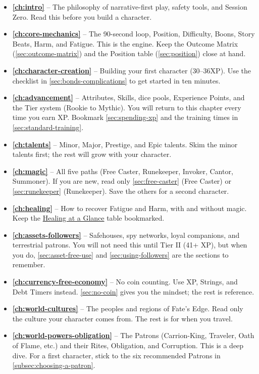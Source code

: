 \begin{itemize}
    \item \textbf{\autoref{ch:intro}} -- The philosophy of narrative-first play, safety tools, and Session Zero. Read this before you build a character.
    \item \textbf{\autoref{ch:core-mechanics}} -- The 90-second loop, Position, Difficulty, Boons, Story Beats, Harm, and Fatigue. This is the engine. Keep the Outcome Matrix (\autoref{sec:outcome-matrix}) and the Position table (\autoref{sec:position}) close at hand.
    \item \textbf{\autoref{ch:character-creation}} -- Building your first character (30--36XP). Use the checklist in \autoref{sec:bonds-complications} to get started in ten minutes.
    \item \textbf{\autoref{ch:advancement}} -- Attributes, Skills, dice pools, Experience Points, and the Tier system (Rookie to Mythic). You will return to this chapter every time you earn XP. Bookmark \autoref{sec:spending-xp} and the training times in \autoref{sec:standard-training}.
    \item \textbf{\autoref{ch:talents}} -- Minor, Major, Prestige, and Epic talents. Skim the minor talents first; the rest will grow with your character.
    \item \textbf{\autoref{ch:magic}} -- All five paths (Free Caster, Runekeeper, Invoker, Cantor, Summoner). If you are new, read only \autoref{sec:free-caster} (Free Caster) or \autoref{sec:runekeeper} (Runekeeper). Save the others for a second character.
    \item \textbf{\autoref{ch:healing}} -- How to recover Fatigue and Harm, with and without magic. Keep the \hyperref[sec:healing-summary]{Healing at a Glance} table bookmarked.
    \item \textbf{\autoref{ch:assets-followers}} -- Safehouses, spy networks, loyal companions, and terrestrial patrons. You will not need this until Tier II (41+ XP), but when you do, \autoref{sec:asset-free-use} and \autoref{sec:using-followers} are the sections to remember.
    \item \textbf{\autoref{ch:currency-free-economy}} -- No coin counting. Use XP, Strings, and Debt Timers instead. \autoref{sec:no-coin} gives you the mindset; the rest is reference.
    \item \textbf{\autoref{ch:world-cultures}} -- The peoples and regions of Fate's Edge. Read only the culture your character comes from. The rest is for when you travel.
    \item \textbf{\autoref{ch:world-powers-obligation}} -- The Patrons (Carrion-King, Traveler, Oath of Flame, etc.) and their Rites, Obligation, and Corruption. This is a deep dive. For a first character, stick to the six recommended Patrons in \autoref{subsec:choosing-a-patron}.

\end{itemize}
